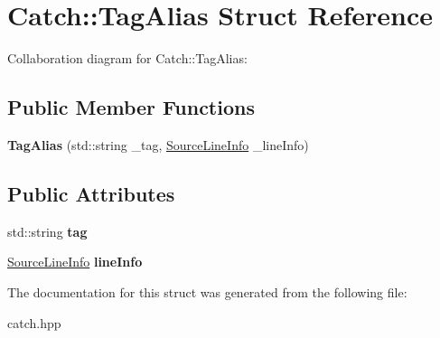 \hypertarget{struct_catch_1_1_tag_alias}{}\section{Catch\+:\+:Tag\+Alias Struct Reference}
\label{struct_catch_1_1_tag_alias}


Collaboration diagram for Catch\+:\+:Tag\+Alias\+:
\subsection*{Public Member Functions}
\begin{DoxyCompactItemize}
\item 
\mbox{\label{struct_catch_1_1_tag_alias_ad9124d03bfb6f767f1c97572330b05bc}} 
{\bfseries Tag\+Alias} (std\+::string \+\_\+tag, \hyperlink{struct_catch_1_1_source_line_info}{Source\+Line\+Info} \+\_\+line\+Info)
\end{DoxyCompactItemize}
\subsection*{Public Attributes}
\begin{DoxyCompactItemize}
\item 
\mbox{\label{struct_catch_1_1_tag_alias_a950183883ab17c90d0fab16b966b6e2d}} 
std\+::string {\bfseries tag}
\item 
\mbox{\label{struct_catch_1_1_tag_alias_a2f51fe0b3c052561275d26b6eb88f702}} 
\hyperlink{struct_catch_1_1_source_line_info}{Source\+Line\+Info} {\bfseries line\+Info}
\end{DoxyCompactItemize}


The documentation for this struct was generated from the following file\+:\begin{DoxyCompactItemize}
\item 
catch.\+hpp\end{DoxyCompactItemize}
